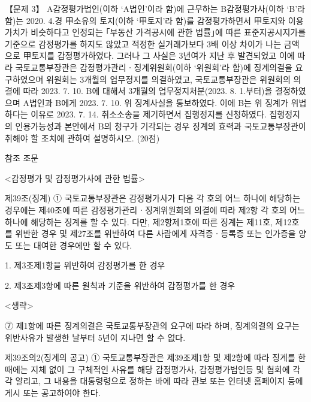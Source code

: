 \begin{longquestion}{【문제 3】}
A감정평가법인(이하 ‘A법인’이라 함)에 근무하는 B감정평가사(이하 ‘B’라 함)는 2020. 4.경 甲소유의 토지(이하 ‘甲토지’라 함)를 감정평가하면서 甲토지와 이용가치가 비슷하다고 인정되는 ｢부동산 가격공시에 관한 법률｣에 따른 표준지공시지가를 기준으로 감정평가를 하지도 않았고 적정한 실거래가보다 3배 이상 차이가 나는 금액으로 甲토지를 감정평가하였다. 그러나 그 사실은 3년여가 지난 후 발견되었고 이에 따라 국토교통부장관은 감정평가관리ㆍ징계위원회(이하 ‘위원회’라 함)에 징계의결을 요구하였으며 위원회는 3개월의 업무정지를 의결하였고, 국토교통부장관은 위원회의 의결에 따라 2023. 7. 10. B에 대해서 3개월의 업무정지처분(2023. 8. 1.부터)을 결정하였으며 A법인과 B에게 2023. 7. 10. 위 징계사실을 통보하였다. 이에 B는 위 징계가 위법하다는 이유로 2023. 7. 14. 취소소송을 제기하면서 집행정지를 신청하였다. 집행정지의 인용가능성과 본안에서 B의 청구가 기각되는 경우 징계의 효력과 국토교통부장관이 취해야 할 조치에 관하여 설명하시오. (20점) \par
\begin{framedtext}
참조 조문 \par
<감정평가 및 감정평가사에 관한 법률> \par
제39조(징계) ① 국토교통부장관은 감정평가사가 다음 각 호의 어느 하나에 해당하는 경우에는 제40조에 따른 감정평가관리ㆍ징계위원회의 의결에 따라 제2항 각 호의 어느 하나에 해당하는 징계를 할 수 있다. 다만, 제2항제1호에 따른 징계는 제11호, 제12호를 위반한 경우 및 제27조를 위반하여 다른 사람에게 자격증ㆍ등록증 또는 인가증을 양도 또는 대여한 경우에만 할 수 있다. \par
1. 제3조제1항을 위반하여 감정평가를 한 경우 \par
2. 제3조제3항에 따른 원칙과 기준을 위반하여 감정평가를 한 경우 \par
<생략> \par
⑦ 제1항에 따른 징계의결은 국토교통부장관의 요구에 따라 하며, 징계의결의 요구는 위반사유가 발생한 날부터 5년이 지나면 할 수 없다. \par
제39조의2(징계의 공고) ① 국토교통부장관은 제39조제1항 및 제2항에 따라 징계를 한 때에는 지체 없이 그 구체적인 사유를 해당 감정평가사, 감정평가법인등 및 협회에 각각 알리고, 그 내용을 대통령령으로 정하는 바에 따라 관보 또는 인터넷 홈페이지 등에 게시 또는 공고하여야 한다. \par

\end{framedtext}
\end{longquestion}
